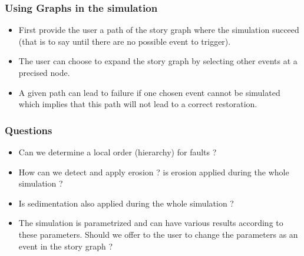 \documentclass{beamer}
\begin{document}
    \begin{frame}
    \frametitle{Using Graphs in the simulation}
    \begin{itemize}
    \item First provide the user a path of the story graph where the simulation succeed (that is to say until there are no possible event to trigger).
    \item The user can choose to expand the story graph by selecting other events at a precised node. 
    \item A given path can lead to failure if one chosen event cannot be simulated which implies that this path will not lead to a correct restoration.
    \end{itemize}
	\end{frame}
	
	\begin{frame}
	\frametitle{Questions}
	\begin{itemize}
	\item Can we determine a local order (hierarchy) for faults ? 
	\item How can we detect and apply erosion ? is erosion applied during the whole simulation ?
	\item Is sedimentation also applied during the whole simulation ?
	\item The simulation is parametrized and can have various results according to these parameters. Should we offer to the user to change the parameters as an event in the story graph ? 
	\end{itemize}
	\end{frame}
	
            
\end{document}
